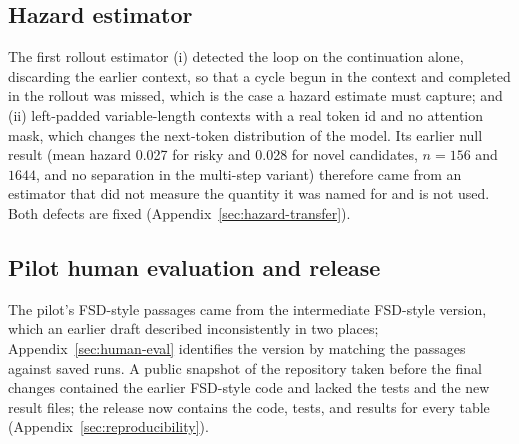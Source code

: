\subsection*{Hazard estimator}
The first rollout estimator (i) detected the loop on the continuation alone, discarding the earlier context, so that a cycle begun in the context and completed in the rollout was missed, which is the case a hazard estimate must capture; and (ii) left-padded variable-length contexts with a real token id and no attention mask, which changes the next-token distribution of the model. Its earlier null result (mean hazard 0.027 for risky and 0.028 for novel candidates, $n{=}156$ and $1644$, and no separation in the multi-step variant) therefore came from an estimator that did not measure the quantity it was named for and is not used. Both defects are fixed (Appendix~\ref{sec:hazard-transfer}).

\subsection*{Pilot human evaluation and release}
The pilot's FSD-style passages came from the intermediate FSD-style version, which an earlier draft described inconsistently in two places; Appendix~\ref{sec:human-eval} identifies the version by matching the passages against saved runs. A public snapshot of the repository taken before the final changes contained the earlier FSD-style code and lacked the tests and the new result files; the release now contains the code, tests, and results for every table (Appendix~\ref{sec:reproducibility}).

